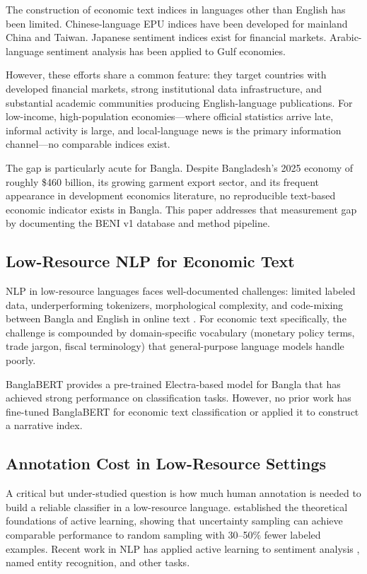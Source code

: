The construction of economic text indices in languages other than English has been limited. Chinese-language EPU indices have been developed for mainland China \citep{huang2018measuring} and Taiwan. Japanese sentiment indices exist for financial markets. Arabic-language sentiment analysis has been applied to Gulf economies.

However, these efforts share a common feature: they target countries with developed financial markets, strong institutional data infrastructure, and substantial academic communities producing English-language publications. For low-income, high-population economies---where official statistics arrive late, informal activity is large, and local-language news is the primary information channel---no comparable indices exist.

The gap is particularly acute for Bangla. Despite Bangladesh's 2025 economy of roughly \$460 billion, its growing garment export sector, and its frequent appearance in development economics literature, no reproducible text-based economic indicator exists in Bangla. This paper addresses that measurement gap by documenting the BENI v1 database and method pipeline.

\subsection{Low-Resource NLP for Economic Text}

NLP in low-resource languages faces well-documented challenges: limited labeled data, underperforming tokenizers, morphological complexity, and code-mixing between Bangla and English in online text \citep{devlin2019bert}. For economic text specifically, the challenge is compounded by domain-specific vocabulary (monetary policy terms, trade jargon, fiscal terminology) that general-purpose language models handle poorly.

BanglaBERT \citep{chowdhury2020banglabert} provides a pre-trained Electra-based model for Bangla that has achieved strong performance on classification tasks. However, no prior work has fine-tuned BanglaBERT for economic text classification or applied it to construct a narrative index.

\subsection{Annotation Cost in Low-Resource Settings}

A critical but under-studied question is how much human annotation is needed to build a reliable classifier in a low-resource language. \citet{settles2009active} established the theoretical foundations of active learning, showing that uncertainty sampling can achieve comparable performance to random sampling with 30--50\% fewer labeled examples. Recent work in NLP has applied active learning to sentiment analysis \citep{shen2018deep}, named entity recognition, and other tasks.


